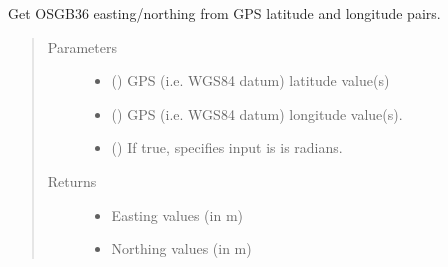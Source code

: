 \documentclass[letterpaper,10pt,english]{sphinxmanual}
\begin{document}

\begin{fulllineitems}
\label{\detokenize{index:flood_tool.get_easting_northing_from_gps_lat_long}}
\sphinxAtStartPar
Get OSGB36 easting/northing from GPS latitude and
longitude pairs.
\begin{quote}\begin{description}
\item[{Parameters}] \leavevmode\begin{itemize}
\item {} 
\sphinxAtStartPar
{} () \textendash{} GPS (i.e. WGS84 datum) latitude value(s)

\item {} 
\sphinxAtStartPar
{} () \textendash{} GPS (i.e. WGS84 datum) longitude value(s).

\item {} 
\sphinxAtStartPar
{} (\sphinxstyleliteralemphasis{\sphinxupquote{ (}}\sphinxstyleliteralemphasis{\sphinxupquote{)}}) \textendash{} If true, specifies input is is radians.

\end{itemize}

\item[{Returns}] \leavevmode
\sphinxAtStartPar
\begin{itemize}
\item {} 
\sphinxAtStartPar
{} \textendash{} Easting values (in m)

\item {} 
\sphinxAtStartPar
{} \textendash{} Northing values (in m)

\end{itemize}



\end{description}
\end{quote}
\end{fulllineitems}
\end{document}
